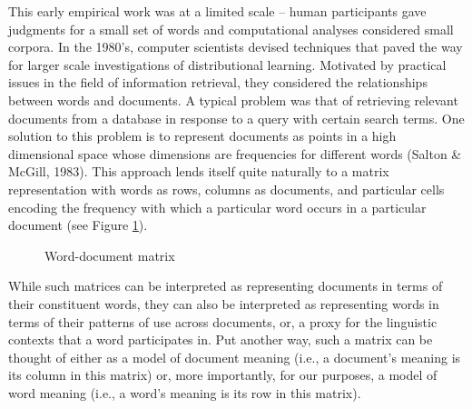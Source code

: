 \documentclass[man,floatsintext]{apa6}
\begin{document}
This early empirical work was at a limited scale -- human participants gave judgments for a small set of words and computational analyses considered small corpora. In the 1980's, computer scientists devised techniques that paved the way for larger scale investigations of distributional learning. Motivated by practical issues in the field of information retrieval, they considered the relationships between words and documents. A typical problem was that of retrieving relevant documents from a database in response to a query with certain search terms. One solution to this problem is to represent documents as points in a high dimensional space whose dimensions are frequencies for different words (Salton \& McGill, 1983). This approach lends itself quite naturally to a matrix representation with words as rows, columns as documents, and particular cells encoding the frequency with which a particular word occurs in a particular document (see Figure \ref{matrix-word-doc}).

\begin{figure}
  \begin{center}
    \footnotesize{}
  \end{center}
  \caption{Word-document matrix}
  \label{matrix-word-doc}
\end{figure}

While such matrices can be interpreted as representing documents in terms of their constituent words, they can also be interpreted as representing words in terms of their patterns of use across documents, or, a proxy for the linguistic contexts that a word participates in. Put another way, such a matrix can be thought of either as a model of document meaning (i.e., a document's meaning is its column in this matrix) or, more importantly, for our purposes, a model of word meaning (i.e., a word's meaning is its row in this matrix).
\end{document}
